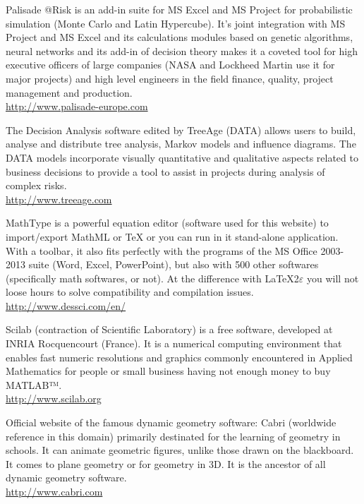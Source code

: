 	{\Large {}}{\Large {}}{\Large {}}{\Large {}} Palisade @Risk is an add-in suite for MS Excel and MS Project for probabilistic simulation (Monte Carlo and Latin Hypercube). It's joint integration with MS Project and MS Excel and its calculations modules based on genetic algorithms, neural networks and its add-in of decision theory makes it a coveted tool for high executive officers of large companies (NASA and Lockheed Martin use it for major projects) and high level engineers in the field finance, quality, project management and production.\\
	\href{http://www.palisade-europe.com}{\color{blue}http://www.palisade-europe.com}
	
	{\Large {}}{\Large {}}{\Large {}}{\Large {}} The Decision Analysis software edited by TreeAge (DATA) allows users to build, analyse and distribute tree analysis, Markov models and influence diagrams. The DATA models incorporate visually quantitative and qualitative aspects related to business decisions to provide a tool to assist in projects during analysis of complex risks.\\
	\href{http://www.treeage.com}{\color{blue}http://www.treeage.com}
	
	{\Large {}}{\Large {}}{\Large {}}{\Large {}} MathType is a powerful equation editor (software used for this website) to import/export MathML or TeX or you can run in it stand-alone application. With a toolbar, it also fits perfectly with the programs of the MS Office 2003-2013 suite (Word, Excel, PowerPoint), but also with 500 other softwares (specifically math softwares, or not). At the difference with \LaTeX 2$\varepsilon$ you will not loose hours to solve compatibility and compilation issues.\\ 
	\href{http://www.dessci.com/en/}{\color{blue}http://www.dessci.com/en/}
	
	{\Large {}}{\Large {}}{\Large {}} Scilab (contraction of Scientific Laboratory) is a free software, developed at INRIA Rocquencourt (France). It is a numerical computing environment that enables fast numeric resolutions and graphics commonly encountered in Applied Mathematics for people or small business having not enough money to buy MATLAB™.\\
	\href{http://www.scilab.org}{\color{blue}http://www.scilab.org}
	
	{\Large {}}{\Large {}} Official website of the famous dynamic geometry software: Cabri (worldwide reference in this domain) primarily destinated for the learning of geometry in schools. It can animate geometric figures, unlike those drawn on the blackboard. It comes to plane geometry or for geometry in 3D. It is the ancestor of all dynamic geometry software.\\
	\href{http://www.cabri.com}{\color{blue}http://www.cabri.com}
	
